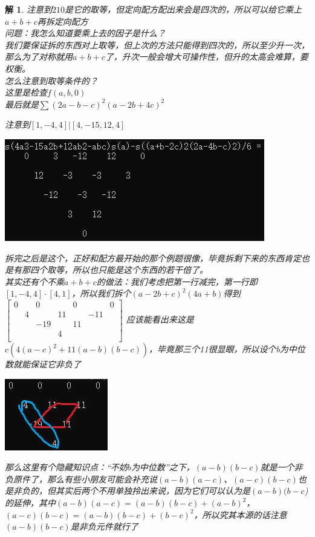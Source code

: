 \documentclass[UTF8]{ctexart}
\newtheorem{2}{解}
\begin{document}
\begin{2}
	注意到$ 210 $是它的取等，但定向配方配出来会是四次的，所以可以给它乘上$ a+b+c $再拆定向配方\\
	问题：我怎么知道要乘上去的因子是什么？\\
	我们要保证拆的东西对上取等，但上次的方法只能得到四次的，所以至少升一次，那么为了对称就用$ a+b+c $了，升次一般会增大可操作性，但升的太高会难算，要权衡。\\
	怎么注意到取等条件的？\\
	这里是检查$ f(a,b,0) $\\
	最后就是$ \displaystyle \sum (2a-b-c)^{2}(a-2b+4c)^{2}$
	
	注意到$ [1,-4,4]|[4,-15,12,4] $
	\begin{center}
		\includegraphics[width=0.5\linewidth]{32}
	\end{center}
	拆完之后是这个，正好和配方最开始的那个例题很像，毕竟拆剩下来的东西肯定也是有那四个取等，所以也只能是这个东西的若干倍了。\\
	其实还有个不乘$ a+b+c $的做法：我们考虑把第一行减完，第一行即$ [1,-4,4]·[4,1] $，所以我们拆个$ (a-2b+c)^{2}(4a+b) $得到$ \left[\begin{matrix}
		0& &0& &0& &0\\
		&4& &11& &-11&\\
		& &-19& &11& & \\
		& & &4& & &\\
	\end{matrix}\right] $
    应该能看出来这是$ c(4(a-c)^{2}+11(a-b)(b-c)) $，毕竟那三个11很显眼，所以设个b为中位数就能保证它非负了
    \begin{center}
    	\includegraphics[width=0.3\linewidth]{33}
    \end{center}
    那么这里有个隐藏知识点：“不妨$ b $为中位数”之下，$ (a-b)(b-c) $就是一个非负原件了，那么有些小朋友可能会补充说$ (a-b)(a-c) $、$ (a-c)(b-c) $也是非负的，但其实后两个不用单独拎出来说，因为它们可以认为是$ (a-b)(b-c $)的延伸，其中$ (a-b)(a-c)=(a-b)(b-c)+(a-b)^{2} $，$ (a-c)(b-c)=(a-b)(b-c)+(b-c)^{2} $，所以究其本源的话注意$ (a-b)(b-c) $是非负元件就行了
\end{2}
\end{document}
